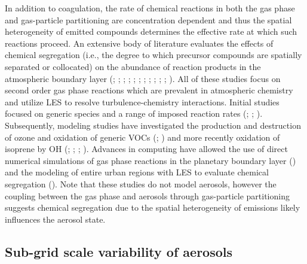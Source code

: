 In addition to coagulation, the rate of chemical reactions in both the gas phase and gas-particle partitioning are concentration dependent and thus the spatial heterogeneity of emitted compounds  determines the effective rate at which such reactions proceed. An extensive body of literature evaluates the effects of chemical segregation (i.e., the degree to which precursor compounds are spatially separated or collocated) on the abundance of reaction products in the atmospheric boundary layer (\cite{schumann_large-eddy_1989}; \cite{sykes_turbulent_1994}; \cite{molemaker_control_1998}; \cite{krol_effects_2000}; \cite{vinuesa_fluxes_2003}; \cite{auger_chemical_2007}; \cite{pugh_influence_2011}; \cite{ouwersloot_segregation_2011}; \cite{dlugi_balances_2014}; \cite{kim_impact_2016}; \cite{li_error_2021}; \cite{wang_segregation_2022}). All of these studies focus on second order gas phase reactions which are prevalent in atmospheric chemistry and utilize LES to resolve turbulence-chemistry interactions. Initial studies focused on generic species and a range of imposed reaction rates (\cite{schumann_large-eddy_1989}; \cite{sykes_turbulent_1994};  \cite{molemaker_control_1998}). Subsequently, modeling studies have investigated the production and destruction of ozone and oxidation of generic VOCs (\cite{krol_effects_2000}; \cite{auger_chemical_2007}) and more recently oxidation of isoprene by OH (\cite{pugh_influence_2011}; \cite{ouwersloot_segregation_2011}; \cite{dlugi_balances_2014}; \cite{kim_impact_2016}). Advances in computing have allowed the use of direct numerical simulations of gas phase reactions in the planetary boundary layer (\cite{li_error_2021}) and the modeling of entire urban regions with LES to evaluate chemical segregation (\cite{wang_segregation_2022}). Note that these studies do not model aerosols, however the coupling between the gas phase and aerosols through gas-particle partitioning suggests  chemical segregation due to the spatial heterogeneity of emissions likely influences the aerosol state. %

\subsection{Sub-grid scale variability of aerosols}

